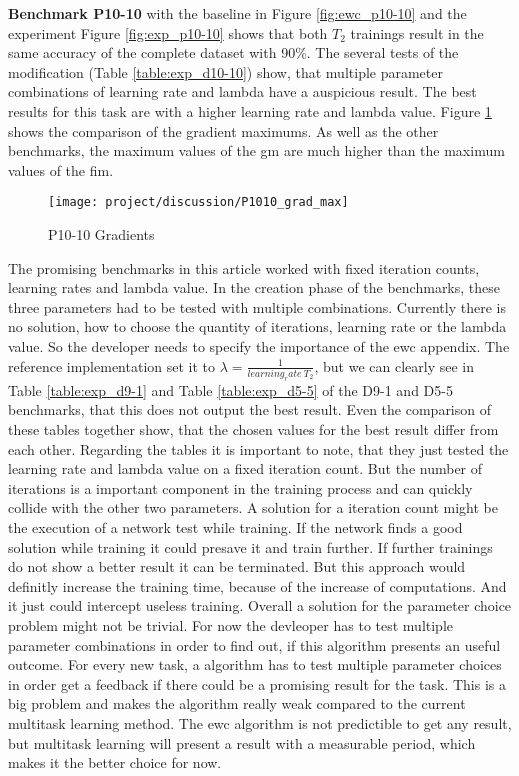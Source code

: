 \textbf{Benchmark P10-10} with the baseline in Figure \ref{fig:ewc_p10-10} and the experiment Figure \ref{fig:exp_p10-10} shows that both $T_2$ trainings result in the same accuracy of the complete dataset with 90\%.
\newline
The several tests of the modification (Table \ref{table:exp_d10-10}) show, that multiple parameter combinations of learning rate and lambda have a auspicious result.
The best results for this task are with a higher learning rate and lambda value.
\newline
Figure \ref{fig:dis_d1010} shows the comparison of the gradient maximums.
As well as the other benchmarks, the maximum values of the \acrshort{gm} are much higher than the maximum values of the \acrshort{fim}.

\begin{figure}[H]
    \centering
    \texttt{[image: project/discussion/P1010\_grad\_max]}
    \caption{P10-10 Gradients}
    \label{fig:dis_d1010}
\end{figure}

The promising benchmarks in this article worked with fixed iteration counts, learning rates and lambda value.
In the creation phase of the benchmarks, these three parameters had to be tested with multiple combinations.
Currently there is no solution, how to choose the quantity of iterations, learning rate or the lambda value.
So the developer needs to specify the importance of the \acrshort{ewc} appendix.
The reference implementation set it to $\lambda = \frac{1}{learning_rate \: T_2 }$, but we can clearly see in Table \ref{table:exp_d9-1} and Table \ref{table:exp_d5-5} of the D9-1 and D5-5 benchmarks, that this does not output the best result.
Even the comparison of these tables together show, that the chosen values for the best result differ from each other.
Regarding the tables it is important to note, that they just tested the learning rate and lambda value on a fixed iteration count.
But the number of iterations is a important component in the training process and can quickly collide with the other two parameters.
A solution for a iteration count might be the execution of a network test while training.
If the network finds a good solution while training it could presave it and train further.
If further trainings do not show a better result it can be terminated.
But this approach would definitly increase the training time, because of the increase of computations.
And it just could intercept useless training.
Overall a solution for the parameter choice problem might not be trivial.
\newline
For now the devleoper has to test multiple parameter combinations in order to find out, if this algorithm presents an useful outcome.
For every new task, a algorithm has to test multiple parameter choices in order get a feedback if there could be a promising result for the task.
This is a big problem and makes the algorithm really weak compared to the current multitask learning method.
The \acrshort{ewc} algorithm is not predictible to get any result, but multitask learning will present a result with a measurable period, which makes it the better choice for now.

